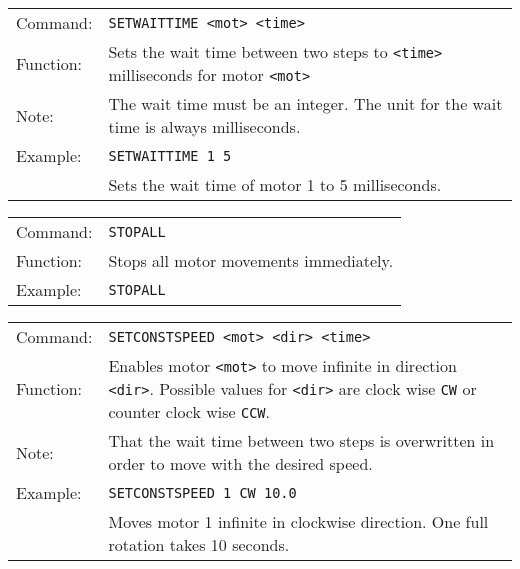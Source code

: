 \vspace{\vdistace}

\begin{table}[!htbp]
  \begin{tabularx}{\textwidth}{lX}
    Command:  & \texttt{SETWAITTIME <mot> <time>}\\
    Function: & Sets the wait time between two steps to \texttt{<time>} milliseconds
                for motor \texttt{<mot>}\\
    Note:     & The wait time must be an integer. The unit for the wait time
                is always milliseconds.\\
    Example:  & \texttt{SETWAITTIME 1 5}\\
              & Sets the wait time of motor 1 to 5 milliseconds.
  \end{tabularx}
\end{table}

\vspace{\vdistace}

\begin{table}[!htbp]
  \begin{tabularx}{\textwidth}{lX}
    Command:  & \texttt{STOPALL}\\
    Function: & Stops all motor movements immediately.\\
    Example:  & \texttt{STOPALL}
  \end{tabularx}
\end{table}

\vspace{\vdistace}

\begin{table}[!htbp]
  \begin{tabularx}{\textwidth}{lX}
    Command:  & \texttt{SETCONSTSPEED <mot> <dir> <time>}\\
    Function: & Enables motor \texttt{<mot>} to move infinite in direction \texttt{<dir>}.
                Possible values for \texttt{<dir>} are clock wise \texttt{CW} or
                counter clock wise \texttt{CCW}. \\
    Note:     & That the wait time between two steps is overwritten in order to move with the desired speed.\\
    Example:  & \texttt{SETCONSTSPEED 1 CW 10.0}\\
              & Moves motor 1 infinite in clockwise direction.
                One full rotation takes 10 seconds.
  \end{tabularx}
\end{table}


